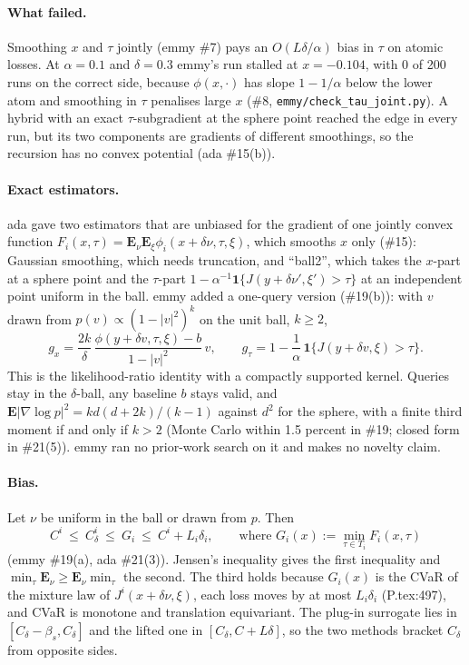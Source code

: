 \documentclass{article}
\newcommand{\E}{\mathbf{E}}
\begin{document}
\paragraph{What failed.} Smoothing $x$ and $\tau$ jointly (emmy \#7) pays
an $O(L\delta/\alpha)$ bias in $\tau$ on atomic losses. At $\alpha=0.1$
and $\delta=0.3$ emmy's run stalled at $x=-0.104$, with 0 of 200 runs on
the correct side, because $\phi(x,\cdot)$ has slope $1-1/\alpha$ below the
lower atom and smoothing in $\tau$ penalises large $x$ (\#8,
\texttt{emmy/check\_tau\_joint.py}). A hybrid with an exact
$\tau$-subgradient at the sphere point reached the edge in every run, but
its two components are gradients of different smoothings, so the
recursion has no convex potential (ada \#15(b)).

\paragraph{Exact estimators.} ada gave two estimators that are unbiased
for the gradient of one jointly convex function
$F_i(x,\tau)=\E_\nu\E_\xi\phi_i(x+\delta\nu,\tau,\xi)$, which smooths $x$
only (\#15): Gaussian smoothing, which needs truncation, and ``ball2'',
which takes the $x$-part at a sphere point and the $\tau$-part
$1-\alpha^{-1}\mathbf 1\{J(y+\delta\nu',\xi')>\tau\}$ at an independent
point uniform in the ball. emmy added a one-query version (\#19(b)): with
$v$ drawn from $p(v)\propto(1-|v|^2)^k$ on the unit ball, $k\ge2$,
\begin{equation*}
g_x=\frac{2k}{\delta}\,\frac{\phi(y+\delta v,\tau,\xi)-b}{1-|v|^2}\,v,
\qquad
g_\tau=1-\frac1\alpha\,\mathbf 1\{J(y+\delta v,\xi)>\tau\}.
\end{equation*}
This is the likelihood-ratio identity with a compactly supported kernel.
Queries stay in the $\delta$-ball, any baseline $b$ stays valid, and
$\E|\nabla\log p|^2=kd(d+2k)/(k-1)$ against $d^2$ for the sphere, with a
finite third moment if and only if $k>2$ (Monte Carlo within 1.5 percent
in \#19; closed form in \#21(5)). emmy ran no prior-work search on it and
makes no novelty claim.

\paragraph{Bias.} Let $\nu$ be uniform in the ball or drawn from $p$.
Then
\begin{equation*}
C^i\ \le\ C^i_\delta\ \le\ G_i\ \le\ C^i+L_i\delta_i,
\qquad\text{where }G_i(x):=\min_{\tau\in T_i}F_i(x,\tau)
\end{equation*}
(emmy \#19(a), ada \#21(3)). Jensen's inequality gives the first
inequality and $\min_\tau\E_\nu\ge\E_\nu\min_\tau$ the second. The third
holds because $G_i(x)$ is the CVaR of the mixture law of
$J^i(x+\delta\nu,\xi)$, each loss moves by at most $L_i\delta_i$
(P.tex:497), and CVaR is monotone and translation equivariant. The
plug-in surrogate lies in $[C_\delta-\beta_s,C_\delta]$ and the lifted one
in $[C_\delta,C+L\delta]$, so the two methods bracket $C_\delta$ from
opposite sides.
\end{document}
